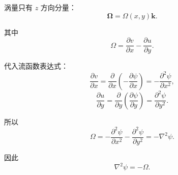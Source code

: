 \documentclass[12pt,a4paper]{ctexart}
\begin{document}
涡量只有 \(z\) 方向分量：
\[
\bm\Omega=\Omega(x,y)\bm k.
\]

其中
\[
\Omega=\frac{\partial v}{\partial x}
-\frac{\partial u}{\partial y}.
\]

代入流函数表达式：
\[
\frac{\partial v}{\partial x}
=\frac{\partial}{\partial x}
\left(-\frac{\partial\psi}{\partial x}\right)
=-\frac{\partial^2\psi}{\partial x^2},
\]
\[
\frac{\partial u}{\partial y}
=\frac{\partial}{\partial y}
\left(\frac{\partial\psi}{\partial y}\right)
=\frac{\partial^2\psi}{\partial y^2}.
\]

所以
\[
\Omega
=-\frac{\partial^2\psi}{\partial x^2}
-\frac{\partial^2\psi}{\partial y^2}
=-\nabla^2\psi.
\]

因此
\[
\boxed{
\nabla^2\psi=-\Omega.
}
\]
\end{document}
